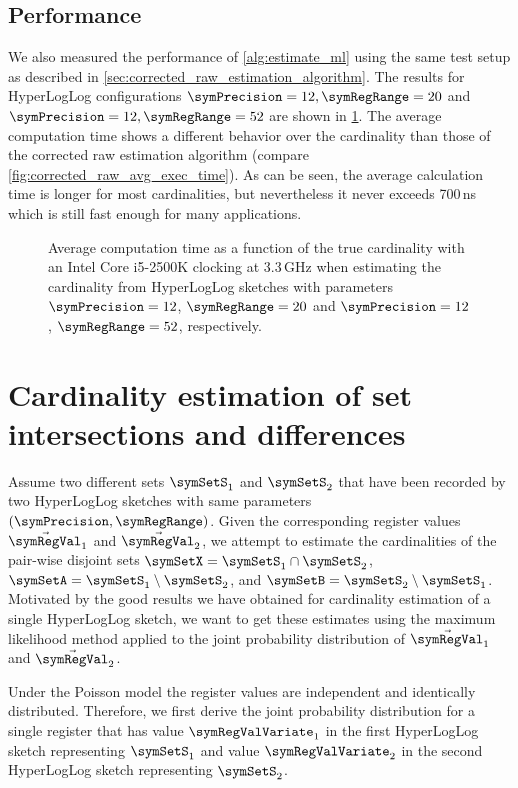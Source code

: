 \documentclass[a4paper]{scrartcl}
\begin{document}
\subsection{Performance}
We also measured the performance of \cref{alg:estimate_ml} using the same test setup as described in \cref{sec:corrected_raw_estimation_algorithm}. The results for HyperLogLog configurations $\symPrecision=12, \symRegRange=20$ and $\symPrecision=12, \symRegRange=52$ are shown in \cref{fig:avg_exec_time}. The average computation time shows a different behavior over the cardinality than those of the corrected raw estimation algorithm (compare \cref{fig:corrected_raw_avg_exec_time}). As can be seen, the average calculation time is longer for most cardinalities, but nevertheless it never exceeds 700\,ns which is still fast enough for many applications.

\begin{figure}
\centering

\caption{Average computation time as a function of the true cardinality with an Intel Core i5-2500K clocking at 3.3\,GHz when estimating the cardinality from HyperLogLog sketches with parameters $\symPrecision=12$, $\symRegRange=20$ and $\symPrecision=12$, $\symRegRange=52$, respectively.}
\label{fig:avg_exec_time}
\end{figure}

\section{Cardinality estimation of set intersections and differences}
Assume two different sets $\symSetS_1$ and $\symSetS_2$ that have been recorded by two HyperLogLog sketches with same parameters $(\symPrecision,\symRegRange)$. Given the corresponding register values $\vec{\symRegVal}_1$ and
$\vec{\symRegVal}_2$, we attempt to estimate the cardinalities of the pair-wise disjoint sets $\symSetX = \symSetS_1\cap\symSetS_2$, $\symSetA = \symSetS_1\setminus\symSetS_2$, and $\symSetB = \symSetS_2\setminus\symSetS_1$. Motivated by the good results we have obtained for cardinality estimation of a single HyperLogLog sketch, we want to get these estimates using the maximum likelihood method applied to the joint probability distribution of $\vec{\symRegVal}_1$ and $\vec{\symRegVal}_2$.

Under the Poisson model the register values are independent and identically distributed. Therefore, we first derive the joint probability distribution for a single register that has value $\symRegValVariate_1$ in the first HyperLogLog sketch representing $\symSetS_1$ and value $\symRegValVariate_2$ in the second HyperLogLog sketch representing $\symSetS_2$. 
\end{document}
